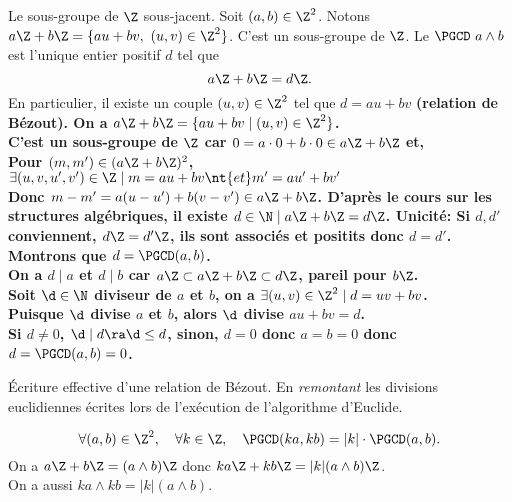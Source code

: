 \documentclass[11pt]{article}
\begin{document}
\begin{prop}{Le sous-groupe de $\Z$ sous-jacent.}{}
    Soit $(a,b)\in\Z^2$. Notons $a\Z+b\Z=\{au+bv,~(u,v)\in\Z^2\}$. C'est un sous-groupe de $\Z$.\n
    Le $\PGCD~a\land b$ est l'unique entier positif $d$ tel que
    \begin{equation*}
        a\Z+b\Z=d\Z.
    \end{equation*}
    En particulier, il existe un couple $(u,v)\in\Z^2$ tel que $d=au+bv$ \bf{(relation de Bézout)}.
    \tcblower
    On a $a\Z+b\Z=\{au+bv\mid(u,v)\in\Z^2\}$.\\
    C'est un sous-groupe de $\Z$ car $0=a\cdot0+b\cdot0\in a\Z+b\Z$ et,\\Pour $(m,m')\in(a\Z+b\Z)^2$, $\exists(u,v,u',v')\in\Z\mid m=au+bv \nt{ et } m'=au'+bv'$\\
    Donc $m-m'=a(u-u')+b(v-v')\in a\Z+b\Z$.\n
    D'après le cours sur les structures algébriques, il existe $d\in\N\mid a\Z+b\Z=d\Z$.\n
    \bf{Unicité:} Si $d,d'$ conviennent, $d\Z=d'\Z$, ils sont associés et positits donc $d=d'$.\n
    Montrons que $d=\PGCD(a,b)$. \\
    On a $d\mid a$ et $d\mid b$ car $a\Z\subset a\Z+b\Z\subset d\Z$, pareil pour $b\Z$.\\
    Soit $\d\in\N$ diviseur de $a$ et $b$, on a $\exists (u,v)\in\Z^2\mid d=uv+bv$.\\
    Puisque $\d$ divise $a$ et $b$, alors $\d$ divise $au+bv=d$.\\
    Si $d\neq0$, $\d\mid d\ra \d\leq d$, sinon, $d=0$ donc $a=b=0$ donc $d=\PGCD(a,b)=0$.
\end{prop}

\begin{meth}{Écriture effective d'une relation de Bézout.}{}
    En \emph{remontant} les divisions euclidiennes écrites lors de l'exécution de l'algorithme d'Euclide.
\end{meth}

\begin{prop}{}{}
    \begin{equation*}
        \forall(a,b)\in\Z^2,\quad\forall k\in\Z,\quad\PGCD(ka,kb)=|k|\cdot\PGCD(a,b).
    \end{equation*}
    \tcblower
    On a $a\Z+b\Z=(a\land b)\Z$ donc $ka\Z+kb\Z=|k|(a\land b)\Z$.\\
    On a aussi $ka\land kb=|k|(a\land b)$.
\end{prop}
\end{document}
